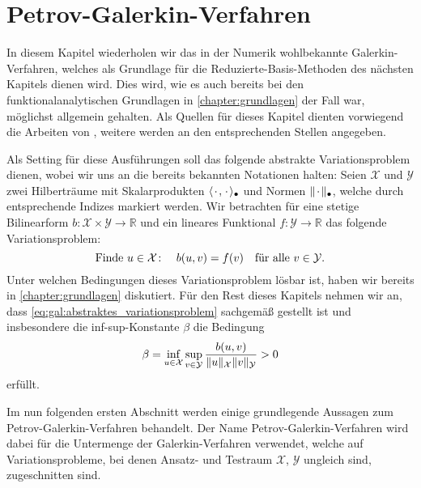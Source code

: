 
\chapter{Petrov-Galerkin-Verfahren} %
\label{chapter:galerkin}

In diesem Kapitel wiederholen wir das in der Numerik wohlbekannte Galerkin-Verfahren, welches als Grundlage für die Reduzierte-Basis-Methoden des nächsten Kapitels dienen wird.
Dies wird, wie es auch bereits bei den funktionalanalytischen Grundlagen in \cref{chapter:grundlagen} der Fall war, möglichst allgemein gehalten.
Als Quellen für dieses Kapitel dienten vorwiegend die Arbeiten von \textcite{Braess:2007wm,Patera:2007un,Quarteroni:2011jm}, weitere werden an den entsprechenden Stellen angegeben.

Als Setting für diese Ausführungen soll das folgende abstrakte Variationsproblem dienen, wobei wir uns an die bereits bekannten Notationen halten: Seien $\mathcal X$ und $\mathcal Y$ zwei Hilberträume mit Skalarprodukten $\langle{\mkern2mu\cdot\mkern2mu},{\mkern2mu\cdot\mkern2mu}\rangle_{\bullet}$ und Normen $\lVert{\mkern2mu\cdot\mkern2mu}\rVert_{\bullet}$, welche durch entsprechende Indizes markiert werden.
Wir betrachten für eine stetige Bilinearform $b \colon \mathcal X \times \mathcal Y \to \mathbb{R}$ und ein lineares Funktional $f \colon \mathcal Y \to \mathbb{R}$ das folgende Variationsproblem:
\begin{equation}
    \label{eq:gal:abstraktes_variationsproblem}
    \text{Finde}~u \in \mathcal X \colon \quad  b(u, v) = f(v) \quad \fa v \in \mathcal Y.
\end{equation}
Unter welchen Bedingungen dieses Variationsproblem lösbar ist, haben wir bereits in \cref{chapter:grundlagen} diskutiert.
Für den Rest dieses Kapitels nehmen wir an, dass \cref{eq:gal:abstraktes_variationsproblem} sachgemäß gestellt ist und insbesondere die inf-sup-Konstante $\beta$ die Bedingung
\begin{equation}
    \label{eq:gal:abstraktes_variationsproblem_infsup}
    \beta = \inf_{u \in \mathcal X} \sup_{v \in \mathcal Y} \frac{b(u, v)}{\norm{u}_{\mathcal X} \norm{v}_{\mathcal Y}} > 0
\end{equation}
erfüllt.

Im nun folgenden ersten Abschnitt werden einige grundlegende Aussagen zum Petrov-Galerkin-Verfahren behandelt.
Der Name Petrov-Galerkin-Verfahren wird dabei für die Untermenge der Galerkin-Verfahren verwendet, welche auf Variationsprobleme, bei denen Ansatz- und Testraum $\mathcal X$, $\mathcal Y$ ungleich sind, zugeschnitten sind.


